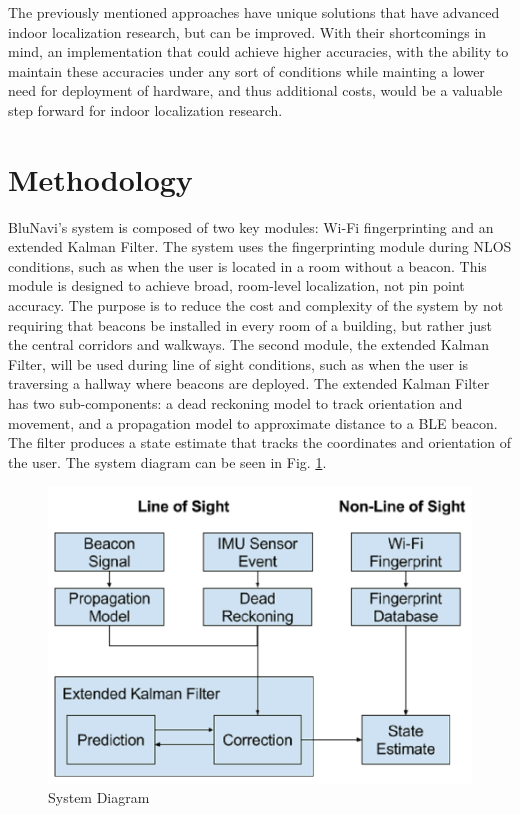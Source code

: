 \documentclass[conference]{IEEEtran}
\begin{document}
The previously mentioned approaches have unique solutions that have advanced indoor localization research, but can be improved. With their shortcomings in mind, an implementation that could achieve higher accuracies, with the ability to maintain these accuracies under any sort of conditions while mainting a lower need for deployment of hardware, and thus additional costs, would be a valuable step forward for indoor localization research. 
\section{Methodology}

BluNavi's system is composed of two key modules: Wi-Fi fingerprinting and an extended Kalman Filter. The system uses the fingerprinting module during NLOS conditions, such as when the user is located in a room without a beacon. This module is designed to achieve broad, room-level localization, not pin point accuracy. The purpose is to reduce the cost and complexity of the system by not requiring that beacons be installed in every room of a building, but rather just the central corridors and walkways. The second module, the extended Kalman Filter, will be used during line of sight conditions, such as when the user is traversing a hallway where beacons are deployed. The extended Kalman Filter has two sub-components: a dead reckoning model to track orientation and movement, and a propagation model to approximate distance to a BLE beacon. The filter produces a state estimate that tracks the coordinates and orientation of the user. The system diagram can be seen in Fig. \ref{fig:sysdiagram}.

\begin{figure}[h]
\centering
\includegraphics[scale=0.25]{SystemDiagram.png}
\caption{System Diagram}
\captionsetup{justification=centering,margin=2cm}
\label{fig:sysdiagram}
\end{figure}
\end{document}
